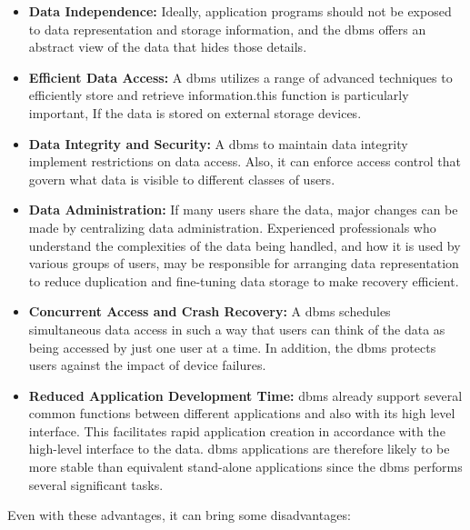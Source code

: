 \begin{itemize}
\item {\textbf{Data Independence:}} Ideally, application programs should not be exposed to data representation and storage information, and the \gls{dbms} offers an abstract view of the data that hides those details.

\item{\textbf{Efficient Data Access:}}
A \gls{dbms} utilizes a range of advanced techniques to efficiently store and retrieve information.this function is particularly important, If the data is stored on external storage devices.

\item{\textbf{Data Integrity and Security:}}  A \gls{dbms} to maintain data integrity implement restrictions on data access. Also, it can enforce access control that govern what data is visible to different classes of users.

\item{\textbf{Data Administration:}} If many users share the data, major changes can be made by centralizing data administration. Experienced professionals who understand the complexities of the data being handled, and how it is used by various groups of users, may be responsible for arranging data representation to reduce duplication and fine-tuning data storage to make recovery efficient.

\item{\textbf{Concurrent Access and Crash Recovery:}} A \gls{dbms} schedules simultaneous data access in such a way that users can think of the data as being accessed by just one user at a time. In addition, the \gls{dbms} protects users against the impact of device failures.

\item{\textbf{Reduced Application Development Time:}} 
\gls{dbms} already support several common functions between different applications and also with its high level interface. This facilitates rapid application creation in accordance with the high-level interface to the data. \gls{dbms} applications are therefore likely to be more stable than equivalent stand-alone applications since the \gls{dbms} performs several significant tasks.
\end{itemize}

Even with these advantages, it can bring some disadvantages:

